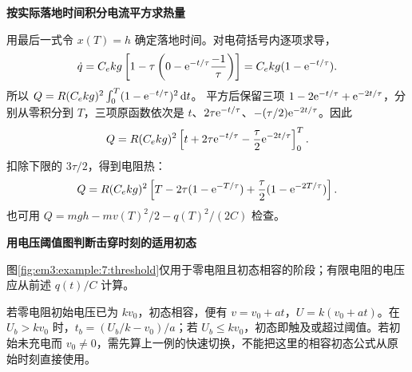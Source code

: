 \begin{solution}
\par\medskip{}\noindent\textbf{按实际落地时间积分电流平方求热量}\par\nobreak
用最后一式令 $x(T)=h$ 确定落地时间。对电荷括号内逐项求导，
\[
 \dot q=C_ekg\left[1-\tau\left(0-\mathrm e^{-t/\tau}\frac{-1}{\tau}\right)\right]
 =C_ekg(1-\mathrm e^{-t/\tau}).
\]
所以 $Q=R(C_ekg)^2\int_0^T(1-\mathrm e^{-t/\tau})^2\mathop{}\!\mathrm d t$。
平方后保留三项 $1-2\mathrm e^{-t/\tau}+\mathrm e^{-2t/\tau}$，分别从零积分到 $T$，三项原函数依次是
$t$、$2\tau\mathrm e^{-t/\tau}$、$-(\tau/2)\mathrm e^{-2t/\tau}$。因此
\[
Q=R(C_ekg)^2
\left[t+2\tau\mathrm e^{-t/\tau}-\frac\tau2\mathrm e^{-2t/\tau}\right]_0^T.
\]
扣除下限的 $3\tau/2$，得到电阻热：
\[Q=R(C_ekg)^2\left[T-2\tau(1-\mathrm e^{-T/\tau})+\frac\tau2(1-\mathrm e^{-2T/\tau})\right].\]
也可用 $Q=mgh-mv(T)^2/2-q(T)^2/(2C)$ 检查。




\par\medskip{}\noindent\textbf{用电压阈值图判断击穿时刻的适用初态}\par\nobreak
{}图\ref{fig:em3:example:7:threshold}仅用于零电阻且初态相容的阶段；有限电阻的电压应从前述 $q(t)/C$ 计算。

若零电阻初始电压已为 $kv_0$，初态相容，便有 $v=v_0+at$，$U=k(v_0+at)$。在 $U_b>kv_0$ 时，$t_b=(U_b/k-v_0)/a$；若 $U_b\le kv_0$，初态即触及或超过阈值。若初始未充电而 $v_0\ne0$，需先算上一例的快速切换，不能把这里的相容初态公式从原始时刻直接使用。\end{solution}
